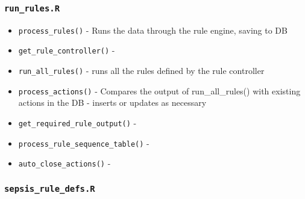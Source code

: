 \documentclass[
]{book}
\providecommand{\tightlist}{%
  \setlength{\itemsep}{0pt}\setlength{\parskip}{0pt}}
\begin{document}
\hypertarget{run_rules.r}{%
\subsubsection{\texorpdfstring{\texttt{run\_rules.R}}{run\_rules.R}}\label{run_rules.r}}

\begin{itemize}
\tightlist
\item
  \texttt{process\_rules()} - Runs the data through the rule engine, saving to DB
\item
  \texttt{get\_rule\_controller()} -
\item
  \texttt{run\_all\_rules()} - runs all the rules defined by the rule controller
\item
  \texttt{process\_actions()} - Compares the output of run\_all\_rules() with existing actions in the DB - inserts or updates as necessary
\item
  \texttt{get\_required\_rule\_output()} -
\item
  \texttt{process\_rule\_sequence\_table()} -
\item
  \texttt{auto\_close\_actions()} -
\end{itemize}

\hypertarget{sepsis_rule_defs.r}{%
\subsubsection{\texorpdfstring{\texttt{sepsis\_rule\_defs.R}}{sepsis\_rule\_defs.R}}\label{sepsis_rule_defs.r}}
\end{document}
